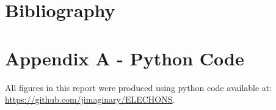 \documentclass[12pt,a4paper]{article} %
\begin{document}


\newpage
\section*{Bibliography}
{}
\vspace{-1.5cm}



\newpage
\section*{Appendix A - Python Code}
All figures in this report were produced using python code available at: \url{https://github.com/jimaginary/ELECHONS}.
\end{document}
